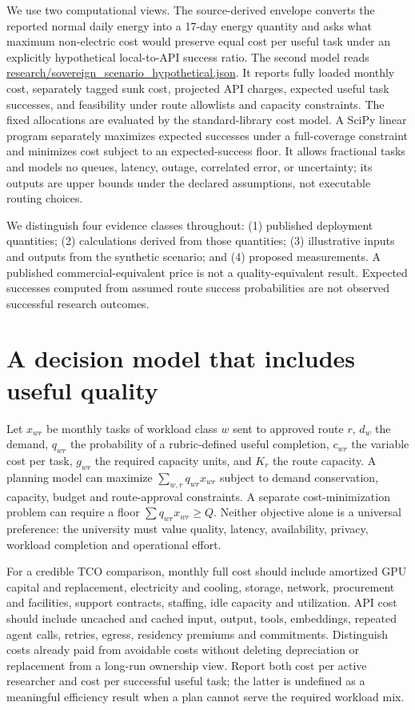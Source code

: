 We use two computational views. The source-derived envelope converts the reported normal daily energy into a 17-day energy quantity and asks what maximum non-electric cost would preserve equal cost per useful task under an explicitly hypothetical local-to-API success ratio. The second model reads \url{research/sovereign_scenario_hypothetical.json}. It reports fully loaded monthly cost, separately tagged sunk cost, projected API charges, expected useful task successes, and feasibility under route allowlists and capacity constraints. The fixed allocations are evaluated by the standard-library cost model. A SciPy linear program separately maximizes expected successes under a full-coverage constraint and minimizes cost subject to an expected-success floor. It allows fractional tasks and models no queues, latency, outage, correlated error, or uncertainty; its outputs are upper bounds under the declared assumptions, not executable routing choices.

We distinguish four evidence classes throughout: (1) published deployment quantities; (2) calculations derived from those quantities; (3) illustrative inputs and outputs from the synthetic scenario; and (4) proposed measurements. A published commercial-equivalent price is not a quality-equivalent result. Expected successes computed from assumed route success probabilities are not observed successful research outcomes.

\section{A decision model that includes useful quality}
Let $x_{wr}$ be monthly tasks of workload class $w$ sent to approved route $r$, $d_w$ the demand, $q_{wr}$ the probability of a rubric-defined useful completion, $c_{wr}$ the variable cost per task, $g_{wr}$ the required capacity units, and $K_r$ the route capacity. A planning model can maximize $\sum_{w,r} q_{wr}x_{wr}$ subject to demand conservation, capacity, budget and route-approval constraints. A separate cost-minimization problem can require a floor $\sum q_{wr}x_{wr}\geq Q$. Neither objective alone is a universal preference: the university must value quality, latency, availability, privacy, workload completion and operational effort.

For a credible TCO comparison, monthly full cost should include amortized GPU capital and replacement, electricity and cooling, storage, network, procurement and facilities, support contracts, staffing, idle capacity and utilization. API cost should include uncached and cached input, output, tools, embeddings, repeated agent calls, retries, egress, residency premiums and commitments. Distinguish costs already paid from avoidable costs without deleting depreciation or replacement from a long-run ownership view. Report both cost per active researcher and cost per successful useful task; the latter is undefined as a meaningful efficiency result when a plan cannot serve the required workload mix.

